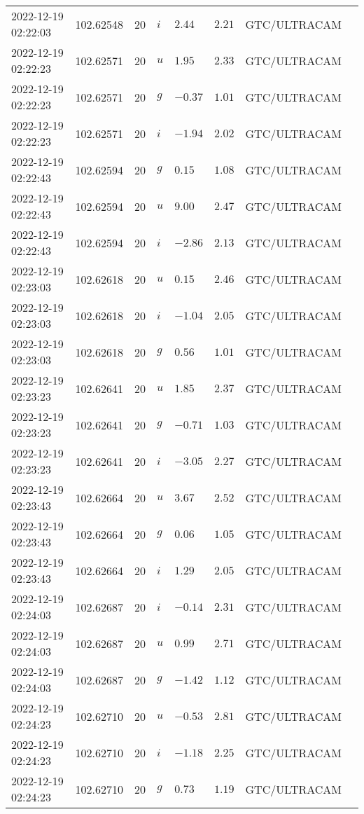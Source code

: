 \documentclass{nature_plusfigure}
\begin{document}
\begin{supplement}
\begin{center}
\begin{longtable}{llllllll}
2022-12-19 02:22:03 & 102.62548 & 20 & $i$ & $2.44$ & $2.21$ & GTC/ULTRACAM &  \\ 
2022-12-19 02:22:23 & 102.62571 & 20 & $u$ & $1.95$ & $2.33$ & GTC/ULTRACAM &  \\ 
2022-12-19 02:22:23 & 102.62571 & 20 & $g$ & $-0.37$ & $1.01$ & GTC/ULTRACAM &  \\ 
2022-12-19 02:22:23 & 102.62571 & 20 & $i$ & $-1.94$ & $2.02$ & GTC/ULTRACAM &  \\ 
2022-12-19 02:22:43 & 102.62594 & 20 & $g$ & $0.15$ & $1.08$ & GTC/ULTRACAM &  \\ 
2022-12-19 02:22:43 & 102.62594 & 20 & $u$ & $9.00$ & $2.47$ & GTC/ULTRACAM &  \\ 
2022-12-19 02:22:43 & 102.62594 & 20 & $i$ & $-2.86$ & $2.13$ & GTC/ULTRACAM &  \\ 
2022-12-19 02:23:03 & 102.62618 & 20 & $u$ & $0.15$ & $2.46$ & GTC/ULTRACAM &  \\ 
2022-12-19 02:23:03 & 102.62618 & 20 & $i$ & $-1.04$ & $2.05$ & GTC/ULTRACAM &  \\ 
2022-12-19 02:23:03 & 102.62618 & 20 & $g$ & $0.56$ & $1.01$ & GTC/ULTRACAM &  \\ 
2022-12-19 02:23:23 & 102.62641 & 20 & $u$ & $1.85$ & $2.37$ & GTC/ULTRACAM &  \\ 
2022-12-19 02:23:23 & 102.62641 & 20 & $g$ & $-0.71$ & $1.03$ & GTC/ULTRACAM &  \\ 
2022-12-19 02:23:23 & 102.62641 & 20 & $i$ & $-3.05$ & $2.27$ & GTC/ULTRACAM &  \\ 
2022-12-19 02:23:43 & 102.62664 & 20 & $u$ & $3.67$ & $2.52$ & GTC/ULTRACAM &  \\ 
2022-12-19 02:23:43 & 102.62664 & 20 & $g$ & $0.06$ & $1.05$ & GTC/ULTRACAM &  \\ 
2022-12-19 02:23:43 & 102.62664 & 20 & $i$ & $1.29$ & $2.05$ & GTC/ULTRACAM &  \\ 
2022-12-19 02:24:03 & 102.62687 & 20 & $i$ & $-0.14$ & $2.31$ & GTC/ULTRACAM &  \\ 
2022-12-19 02:24:03 & 102.62687 & 20 & $u$ & $0.99$ & $2.71$ & GTC/ULTRACAM &  \\ 
2022-12-19 02:24:03 & 102.62687 & 20 & $g$ & $-1.42$ & $1.12$ & GTC/ULTRACAM &  \\ 
2022-12-19 02:24:23 & 102.62710 & 20 & $u$ & $-0.53$ & $2.81$ & GTC/ULTRACAM &  \\ 
2022-12-19 02:24:23 & 102.62710 & 20 & $i$ & $-1.18$ & $2.25$ & GTC/ULTRACAM &  \\ 
2022-12-19 02:24:23 & 102.62710 & 20 & $g$ & $0.73$ & $1.19$ & GTC/ULTRACAM &  \\ 

\end{longtable}
\end{center}
\end{supplement}
\end{document}
